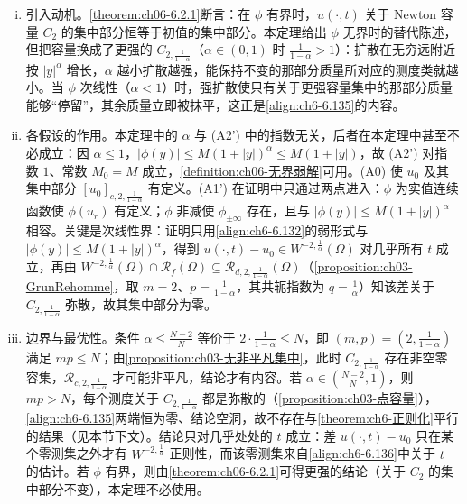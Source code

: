 \documentclass[../../main.tex]{subfiles}%
\begin{document}
\begin{remark}\label{remark:ch06-正则化动机}
\begin{enumerate}[(i)]
\item 引入动机。\cref{theorem:ch06-6.2.1}断言：在 $\phi$ 有界时，$u(\cdot,t)$ 关于 Newton 容量 $C_2$ 的集中部分恒等于初值的集中部分。本定理给出 $\phi$ 无界时的替代陈述，但把容量换成了更强的 $C_{2,\frac{1}{1-\alpha}}$（$\alpha\in(0,1)$ 时 $\frac{1}{1-\alpha}>1$）：扩散在无穷远附近按 $|y|^{\alpha}$ 增长，$\alpha$ 越小扩散越强，能保持不变的那部分质量所对应的测度类就越小。当 $\phi$ 次线性（$\alpha<1$）时，强扩散使只有关于更强容量集中的那部分质量能够“停留”，其余质量立即被抹平，这正是\eqref{align:ch6-6.135}的内容。

\item 各假设的作用。本定理中的 $\alpha$ 与 (A2') 中的指数无关，后者在本定理中甚至不必成立：因 $\alpha\leqslant1$，$|\phi(y)|\leqslant M(1+|y|)^{\alpha}\leqslant M(1+|y|)$，故 (A2') 对指数 $1$、常数 $M_0=M$ 成立，\cref{definition:ch06-无界弱解}可用。(A0) 使 $u_0$ 及其集中部分 $[u_0]_{c,2,\frac{1}{1-\alpha}}$ 有定义。(A1') 在证明中只通过两点进入：$\phi$ 为实值连续函数使 $\phi(u_r)$ 有定义；$\phi$ 非减使 $\phi_{\pm\infty}$ 存在，且与 $|\phi(y)|\leqslant M(1+|y|)^\alpha$ 相容。关键是次线性界：证明只用\eqref{align:ch6-6.132}的弱形式与 $|\phi(y)|\leqslant M(1+|y|)^{\alpha}$，得到 $u(\cdot,t)-u_0\in W^{-2,\frac{1}{\alpha}}(\Omega)$ 对几乎所有 $t$ 成立，再由 $W^{-2,\frac{1}{\alpha}}(\Omega)\cap\mathscr{R}_f(\Omega)\subseteq\mathscr{R}_{d,2,\frac{1}{1-\alpha}}(\Omega)$（\cref{proposition:ch03-GrunRehomme}，取 $m=2$、$p=\frac{1}{1-\alpha}$，其共轭指数为 $q=\frac{1}{\alpha}$）知该差关于 $C_{2,\frac{1}{1-\alpha}}$ 弥散，故其集中部分为零。

\item 边界与最优性。条件 $\alpha\leqslant\frac{N-2}{N}$ 等价于 $2\cdot\frac{1}{1-\alpha}\leqslant N$，即 $(m,p)=(2,\frac{1}{1-\alpha})$ 满足 $mp\leqslant N$；由\cref{proposition:ch03-无非平凡集中}，此时 $C_{2,\frac{1}{1-\alpha}}$ 存在非空零容集，$\mathscr{R}_{c,2,\frac{1}{1-\alpha}}$ 才可能非平凡，结论才有内容。若 $\alpha\in(\frac{N-2}{N},1)$，则 $mp>N$，每个测度关于 $C_{2,\frac{1}{1-\alpha}}$ 都是弥散的（\cref{proposition:ch03-点容量}），\eqref{align:ch6-6.135}两端恒为零、结论空洞，故不存在与\cref{theorem:ch6-正则化}平行的结果（见本节下文）。结论只对几乎处处的 $t$ 成立：差 $u(\cdot,t)-u_0$ 只在某个零测集之外才有 $W^{-2,\frac{1}{\alpha}}$ 正则性，而该零测集来自\eqref{align:ch6-6.136}中关于 $t$ 的估计。若 $\phi$ 有界，则由\cref{theorem:ch06-6.2.1}可得更强的结论（关于 $C_2$ 的集中部分不变），本定理不必使用。
\end{enumerate}
\end{remark}
\end{document}
